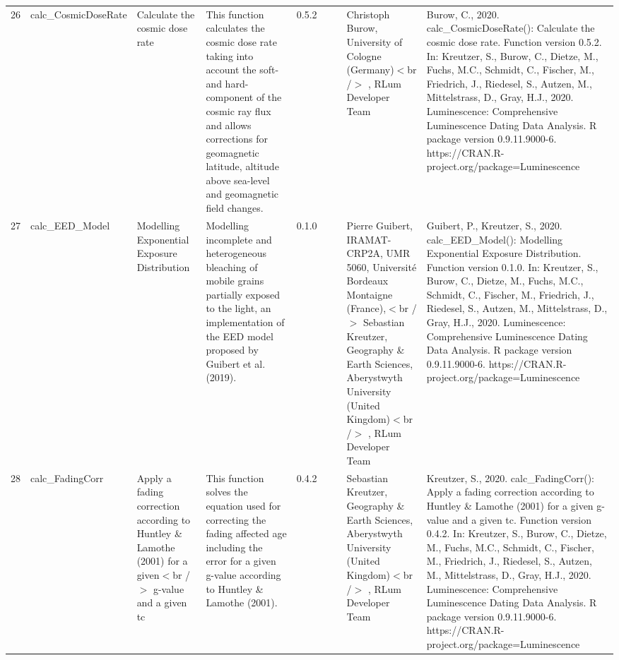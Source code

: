 \begin{table}[ht]
\begin{tabular}{rllllllll}
 \\ 
  26 & calc\_CosmicDoseRate & Calculate the cosmic dose rate & This function calculates the cosmic dose rate taking into account the soft- and hard-component of the cosmic ray flux and allows corrections for geomagnetic latitude, altitude above sea-level and geomagnetic field changes. & 0.5.2
 &  &  & Christoph Burow, University of Cologne (Germany)$<$br /$>$ , RLum Developer Team & Burow, C., 2020. calc\_CosmicDoseRate(): Calculate the cosmic dose rate. Function version 0.5.2. In: Kreutzer, S., Burow, C., Dietze, M., Fuchs, M.C., Schmidt, C., Fischer, M., Friedrich, J., Riedesel, S., Autzen, M., Mittelstrass, D., Gray, H.J., 2020. Luminescence: Comprehensive Luminescence Dating Data Analysis. R package version 0.9.11.9000-6. https://CRAN.R-project.org/package=Luminescence
 \\ 
  27 & calc\_EED\_Model & Modelling Exponential Exposure Distribution & Modelling incomplete and heterogeneous bleaching of mobile grains partially exposed to the light, an implementation of the EED model proposed by Guibert et al. (2019). & 0.1.0
 &  &  & Pierre Guibert, IRAMAT-CRP2A, UMR 5060, Université Bordeaux Montaigne (France),$<$br /$>$ Sebastian Kreutzer, Geography \& Earth Sciences, Aberystwyth University (United Kingdom)$<$br /$>$ , RLum Developer Team & Guibert, P., Kreutzer, S., 2020. calc\_EED\_Model(): Modelling Exponential Exposure Distribution. Function version 0.1.0. In: Kreutzer, S., Burow, C., Dietze, M., Fuchs, M.C., Schmidt, C., Fischer, M., Friedrich, J., Riedesel, S., Autzen, M., Mittelstrass, D., Gray, H.J., 2020. Luminescence: Comprehensive Luminescence Dating Data Analysis. R package version 0.9.11.9000-6. https://CRAN.R-project.org/package=Luminescence
 \\ 
  28 & calc\_FadingCorr & Apply a fading correction according to Huntley \& Lamothe (2001) for a given$<$br /$>$ g-value and a given tc & This function solves the equation used for correcting the fading affected age including the error for a given g-value according to Huntley \& Lamothe (2001). & 0.4.2
 &  &  & Sebastian Kreutzer, Geography \& Earth Sciences, Aberystwyth University (United Kingdom)$<$br /$>$ , RLum Developer Team & Kreutzer, S., 2020. calc\_FadingCorr(): Apply a fading correction according to Huntley \& Lamothe (2001) for a given g-value and a given tc. Function version 0.4.2. In: Kreutzer, S., Burow, C., Dietze, M., Fuchs, M.C., Schmidt, C., Fischer, M., Friedrich, J., Riedesel, S., Autzen, M., Mittelstrass, D., Gray, H.J., 2020. Luminescence: Comprehensive Luminescence Dating Data Analysis. R package version 0.9.11.9000-6. https://CRAN.R-project.org/package=Luminescence

\end{tabular}
\end{table}
